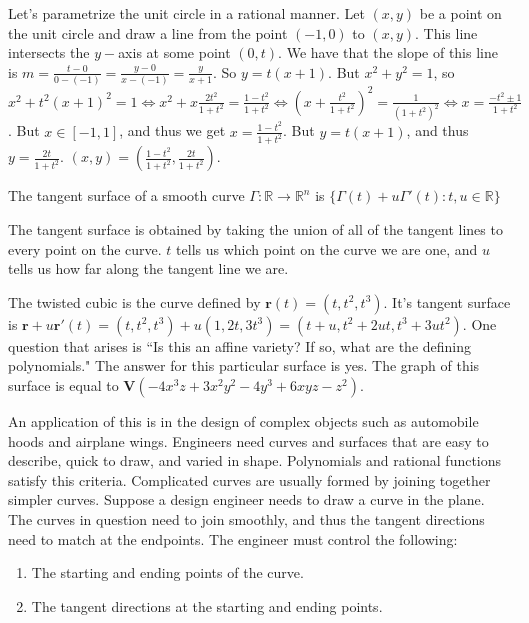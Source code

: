 \documentclass[crop=false,class=article,oneside]{standalone}
\begin{document}
    \begin{example}
    Let's parametrize the unit circle in a rational manner. Let $(x,y)$ be a point on the unit circle and draw a line from the point $(-1,0)$ to $(x,y)$. This line intersects the $y-$axis at some point $(0,t)$. We have that the slope of this line is $m =\frac{t-0}{0-(-1)}=\frac{y-0}{x-(-1)}=\frac{y}{x+1}$. So $y=t(x+1)$. But $x^{2}+y^{2}=1$, so $x^2+t^{2}(x+1)^{2}=1\Leftrightarrow x^{2}+x\frac{2t^{2}}{1+t^{2}}=\frac{1-t^2}{1+t^2}\Leftrightarrow (x+\frac{t^{2}}{1+t^{2}})^{2}=\frac{1}{(1+t^{2})^{2}}\Leftrightarrow x=\frac{-t^{2}\pm 1}{1+t^{2}}$. But $x\in [-1,1]$, and thus we get $x = \frac{1-t^2}{1+t^2}$. But $y = t(x+1)$, and thus $y = \frac{2t}{1+t^2}$. $(x,y)=(\frac{1-t^{2}}{1+t^{2}},\frac{2t}{1+t^{2}})$.
    \end{example}
    \begin{definition}
    The tangent surface of a smooth curve $\Gamma:\mathbb{R}\rightarrow \mathbb{R}^n$ is $\{\Gamma(t)+u\Gamma'(t):t,u\in \mathbb{R}\}$
    \end{definition}
    \begin{remark}
    The tangent surface is obtained by taking the union of all of the tangent lines to every point on the curve. $t$ tells us which point on the curve we are one, and $u$ tells us how far along the tangent line we are.
    \end{remark}
    \begin{example}
    The twisted cubic is the curve defined by $\mathbf{r}(t) = (t,t^2,t^3)$. It's tangent surface is $\mathbf{r}+u\mathbf{r}'(t)=(t,t^2,t^3)+u(1,2t,3t^3)=(t+u,t^2+2ut,t^3+3ut^2)$. One question that arises is ``Is this an affine variety? If so, what are the defining polynomials." The answer for this particular surface is yes. The graph of this surface is equal to $\mathbf{V}(-4x^3z+3x^2y^2-4y^3+6xyz-z^2)$.
    \end{example}
    An application of this is in the design of complex objects such as automobile hoods and airplane wings. Engineers need curves and surfaces that are easy to describe, quick to draw, and varied in shape. Polynomials and rational functions satisfy this criteria. Complicated curves are usually formed by joining together simpler curves. Suppose a design engineer needs to draw a curve in the plane. The curves in question need to join smoothly, and thus the tangent directions need to match at the endpoints. The engineer must control the following:
    \begin{enumerate}
        \item The starting and ending points of the curve.
        \item The tangent directions at the starting and ending points.
    \end{enumerate}
\end{document}
